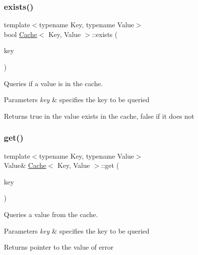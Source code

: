 \subsubsection{\texorpdfstring{exists()}{exists()}}
{\footnotesize\ttfamily template$<$typename Key, typename Value$>$ \\
bool \hyperlink{classCache}{Cache}$<$ Key, Value $>$\+::exists (\begin{DoxyParamCaption}\item[{const Key \&}]{key }\end{DoxyParamCaption})\hspace{0.3cm}{\ttfamily [inline]}}



Queries if a value is in the cache. 


\begin{DoxyParams}{Parameters}
{\em key} & specifies the key to be queried \\
\hline
\end{DoxyParams}
\begin{DoxyReturn}{Returns}
true in the value exists in the cache, false if it does not 
\end{DoxyReturn}
\mbox{\label{classCache_ae2c5a764bec9cf7bcc455d37377ff477}} 
\subsubsection{\texorpdfstring{get()}{get()}}
{\footnotesize\ttfamily template$<$typename Key, typename Value$>$ \\
Value\& \hyperlink{classCache}{Cache}$<$ Key, Value $>$\+::get (\begin{DoxyParamCaption}\item[{const Key \&}]{key }\end{DoxyParamCaption})\hspace{0.3cm}{\ttfamily [inline]}}



Queries a value from the cache. 


\begin{DoxyParams}{Parameters}
{\em key} & specifies the key to be queried \\
\hline
\end{DoxyParams}
\begin{DoxyReturn}{Returns}
pointer to the value of error 
\end{DoxyReturn}
\mbox{\label{classCache_a7b54629fb513d4b1652951bb713a0635}} 
